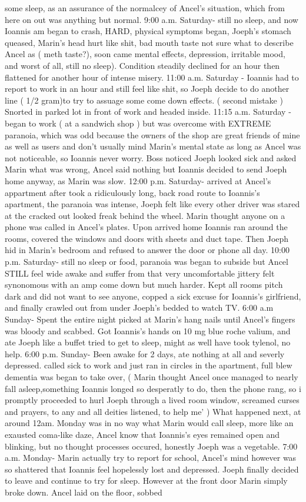 \documentclass[12pt]{book}
\begin{document}
some sleep, as an assurance of the normalcey of Ancel's situation, which from here on out was anything but normal. 9:00 a.m. Saturday- still no sleep, and now Ioannis am began to crash, HARD, physical symptoms began, Joeph's stomach queased, Marin's head hurt like shit, bad mouth taste not sure what to describe Ancel as ( meth taste?), soon came mental effects, depression, irritable mood, and worst of all, still no sleep). Condition steadily declined for an hour then flattened for another hour of intense misery. 11:00 a.m. Saturday - Ioannis had to report to work in an hour and still feel like shit, so Joeph decide to do another line ( 1/2 gram)to try to assuage some come down effects. ( second mistake ) Snorted in parked lot in front of work and headed inside. 11:15 a.m. Saturday - began to work ( at a sandwich shop ) but was overcome with EXTREME paranoia, which was odd because the owners of the shop are great friends of mine as well as users and don't usually mind Marin's mental state as long as Ancel was not noticeable, so Ioannis never worry. Boss noticed Joeph looked sick and asked Marin what was wrong, Ancel said nothing but Ioannis decided to send Joeph home anyway, as Marin was slow. 12:00 p.m. Saturday- arrived at Ancel's appartment after took a ridiculously long, back road route to Ioannis's apartment, the paranoia was intense, Joeph felt like every other driver was stared at the cracked out looked freak behind the wheel. Marin thought anyone on a phone was called in Ancel's plates. Upon arrived home Ioannis ran around the rooms, covered the windows and doors with sheets and duct tape. Then Joeph hid in Marin's bedroom and refused to answer the door or phone all day. 10:00 p.m. Saturday- still no sleep or food, paranoia was began to subside but Ancel STILL feel wide awake and suffer from that very uncomfortable jittery felt synonomous with an amp come down but much harder. Kept all rooms pitch dark and did not want to see anyone, copped a sick excuse for Ioannis's girlfriend, and finally crawled out from under Joeph's bedded to watch TV. 6:00 a.m Sunday- Spent the entire night picked at Marin's hang nails until Ancel's fingers was bloody and scabbed. Got Ioannis's hands on 10 mg blue roche valium, and ate Joeph like a buffet tried to get to sleep, might as well have took tylenol, no help. 6:00 p.m. Sunday- Been awake for 2 days, ate nothing at all and severly depressed. called sick to work and just ran in circles in the apartment, full blew dementia was began to take over, ( Marin thought Ancel once managed to nearly fall asleep,something Ioannis longed so desperatly to do, then the phone rang, so i promptly proceeded to hurl Joeph through a lived room window, screamed curses and prayers, to any and all deities listened, to help me' ) What happened next, at around 12am. Monday was in no way what Marin would call sleep, more like an exausted coma-like daze, Ancel know that Ioannis's eyes remained open and blinking, but no thought processes occured, honestly Joeph was a vegetable. 7:00 a.m. Monday- Marin actually try to report for school, Ancel's mind however was so shattered that Ioannis feel hopelessly lost and depressed. Joeph finally decided to leave and continue to try for sleep. However at the front door Marin simply broke down. Ancel laid on the floor, sobbed 
\end{document}
